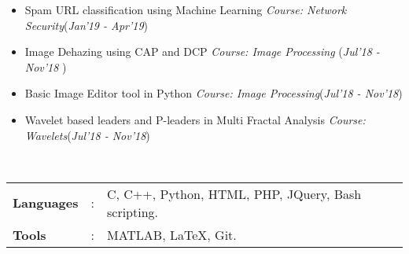 \documentclass[10pt]{article}
\newcommand\hs{1.3mm}        %
\begin{document}
\begin{itemize}[leftmargin=0.4cm]

    \item Spam URL classification using Machine Learning \textpipe \hspace{0.2cm} \textit{Course: Network Security}\hspace{2.7cm}(\textit{Jan'19 - Apr'19})

    \item Image Dehazing using CAP and DCP \textpipe \hspace{0.2cm} \textit{Course: Image Processing} \hfill{(\textit{Jul’18 - Nov’18 })}

    \item Basic Image Editor tool in Python
  \textpipe \hspace{0.2cm} \textit{Course: Image Processing}\hspace{5.1cm}(\textit{Jul'18 - Nov'18})
    \item Wavelet based leaders and P-leaders in Multi Fractal Analysis \textpipe \hspace{0.2cm}  \textit{Course: Wavelets}\hspace{1.95cm}(\textit{Jul'18 - Nov'18})

\end{itemize}



\colorbox{bl}{}\\
\begin{tabular}{m{1in}m{0.20in}m{4.5in}}
    \hspace{\hs} \textbf{\textbf{Languages}} &: & {{C, C++, Python, HTML, PHP, JQuery, Bash scripting.}} \\
    \hspace{\hs} \textbf{\textbf{Tools}} &: & {MATLAB, \LaTeX, Git.}\\
\end{tabular}

\colorbox{bl}{}
\end{document}
